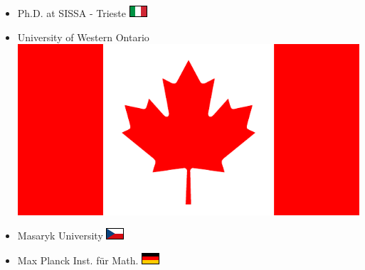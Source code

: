 \documentclass{beamer}
\author{Fosco Loregian \darkLogo}
\title{}
\date{\today}
\begin{document}
\begin{frame}
  \maketitle
\end{frame}
\begin{frame}
  \begin{itemize}
    \item<+-> Ph.D. at SISSA - Trieste \includegraphics{ita.pdf}

    \item<+-> University of Western Ontario \includegraphics[scale=.04]{can.pdf}
    
    \item<+-> Masaryk University \includegraphics{czr.pdf}
    
    \item<+-> Max Planck Inst. für Math. \includegraphics{ger.pdf}
    

\end{itemize}
\end{frame}
\end{document}
